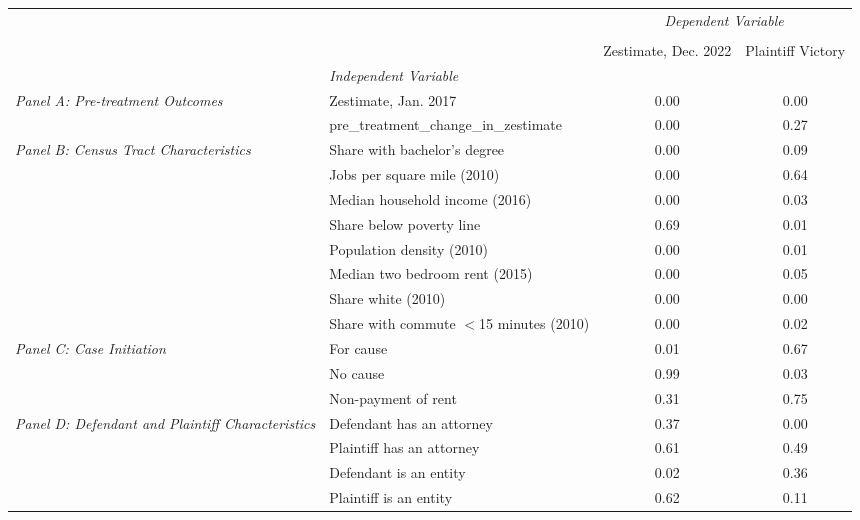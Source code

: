 \begin{tabular}{llcc}
\toprule
 &  & \multicolumn{2}{c}{\textit{Dependent Variable}} \\
\cline{3-4}
\\
 &  & Zestimate, Dec. 2022 & Plaintiff Victory \\
 & \emph{Independent Variable} &  &  \\
\midrule
\multirow[c]{2}{3cm}{\textit{Panel A: Pre-treatment Outcomes}} & Zestimate, Jan. 2017 & 0.00 & 0.00 \\
 & pre_treatment_change_in_zestimate & 0.00 & 0.27 \\
\cline{1-4}
\multirow[c]{8}{3cm}{\textit{Panel B: Census Tract Characteristics}} & Share with bachelor's degree & 0.00 & 0.09 \\
 & Jobs per square mile (2010) & 0.00 & 0.64 \\
 & Median household income (2016) & 0.00 & 0.03 \\
 & Share below poverty line & 0.69 & 0.01 \\
 & Population density (2010) & 0.00 & 0.01 \\
 & Median two bedroom rent (2015) & 0.00 & 0.05 \\
 & Share white (2010) & 0.00 & 0.00 \\
 & Share with commute $<$15 minutes (2010) & 0.00 & 0.02 \\
\cline{1-4}
\multirow[c]{3}{3cm}{\textit{Panel C: Case Initiation}} & For cause & 0.01 & 0.67 \\
 & No cause & 0.99 & 0.03 \\
 & Non-payment of rent & 0.31 & 0.75 \\
\cline{1-4}
\multirow[c]{4}{3cm}{\textit{Panel D: Defendant and Plaintiff Characteristics}} & Defendant has an attorney & 0.37 & 0.00 \\
 & Plaintiff has an attorney & 0.61 & 0.49 \\
 & Defendant is an entity & 0.02 & 0.36 \\
 & Plaintiff is an entity & 0.62 & 0.11 \\
\cline{1-4}
\bottomrule
\end{tabular}
